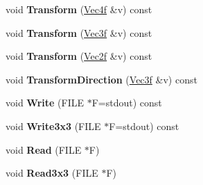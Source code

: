 \begin{DoxyCompactItemize}
\item 
\hypertarget{classMatrix_a815a83fda075f44bf71f13defca9f83e}{void {\bfseries \-Transform} (\hyperlink{classVec4f}{\-Vec4f} \&v) const }\label{classMatrix_a815a83fda075f44bf71f13defca9f83e}

\item 
\hypertarget{classMatrix_a7208989bf27372bb361390c4b4df2157}{void {\bfseries \-Transform} (\hyperlink{classVec3f}{\-Vec3f} \&v) const }\label{classMatrix_a7208989bf27372bb361390c4b4df2157}

\item 
\hypertarget{classMatrix_a16f9a1cf796c64979de415ba161ef84c}{void {\bfseries \-Transform} (\hyperlink{classVec2f}{\-Vec2f} \&v) const }\label{classMatrix_a16f9a1cf796c64979de415ba161ef84c}

\item 
\hypertarget{classMatrix_a21f46ddfd67d21e873076e468f9b793e}{void {\bfseries \-Transform\-Direction} (\hyperlink{classVec3f}{\-Vec3f} \&v) const }\label{classMatrix_a21f46ddfd67d21e873076e468f9b793e}

\item 
\hypertarget{classMatrix_ae8ba2f4d4b1431f5a0a9b77e654a544f}{void {\bfseries \-Write} (\-F\-I\-L\-E $\ast$\-F=stdout) const }\label{classMatrix_ae8ba2f4d4b1431f5a0a9b77e654a544f}

\item 
\hypertarget{classMatrix_a2c6c2fd2c666999a410ebccbd510d4fe}{void {\bfseries \-Write3x3} (\-F\-I\-L\-E $\ast$\-F=stdout) const }\label{classMatrix_a2c6c2fd2c666999a410ebccbd510d4fe}

\item 
\hypertarget{classMatrix_a6b4caf9e67b3981b432a7d7ea33530fa}{void {\bfseries \-Read} (\-F\-I\-L\-E $\ast$\-F)}\label{classMatrix_a6b4caf9e67b3981b432a7d7ea33530fa}

\item 
\hypertarget{classMatrix_aa9884c4699079277f126cbaef4b76df6}{void {\bfseries \-Read3x3} (\-F\-I\-L\-E $\ast$\-F)}\label{classMatrix_aa9884c4699079277f126cbaef4b76df6}

\end{DoxyCompactItemize}
